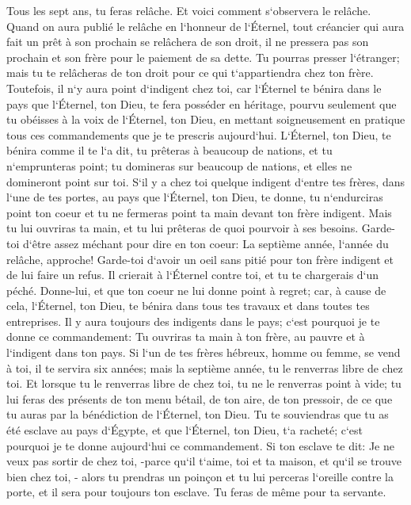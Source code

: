\verse Tous les sept ans, tu feras relâche. 
\verse Et voici comment s`observera le relâche. Quand on aura publié le relâche en l`honneur de l`Éternel, tout créancier qui aura fait un prêt à son prochain se relâchera de son droit, il ne pressera pas son prochain et son frère pour le paiement de sa dette. 
\verse Tu pourras presser l`étranger; mais tu te relâcheras de ton droit pour ce qui t`appartiendra chez ton frère. 
\verse Toutefois, il n`y aura point d`indigent chez toi, car l`Éternel te bénira dans le pays que l`Éternel, ton Dieu, te fera posséder en héritage, 
\verse pourvu seulement que tu obéisses à la voix de l`Éternel, ton Dieu, en mettant soigneusement en pratique tous ces commandements que je te prescris aujourd`hui. 
\verse L`Éternel, ton Dieu, te bénira comme il te l`a dit, tu prêteras à beaucoup de nations, et tu n`emprunteras point; tu domineras sur beaucoup de nations, et elles ne domineront point sur toi. 
\verse S`il y a chez toi quelque indigent d`entre tes frères, dans l`une de tes portes, au pays que l`Éternel, ton Dieu, te donne, tu n`endurciras point ton coeur et tu ne fermeras point ta main devant ton frère indigent. 
\verse Mais tu lui ouvriras ta main, et tu lui prêteras de quoi pourvoir à ses besoins. 
\verse Garde-toi d`être assez méchant pour dire en ton coeur: La septième année, l`année du relâche, approche! Garde-toi d`avoir un oeil sans pitié pour ton frère indigent et de lui faire un refus. Il crierait à l`Éternel contre toi, et tu te chargerais d`un péché. 
\verse Donne-lui, et que ton coeur ne lui donne point à regret; car, à cause de cela, l`Éternel, ton Dieu, te bénira dans tous tes travaux et dans toutes tes entreprises. 
\verse Il y aura toujours des indigents dans le pays; c`est pourquoi je te donne ce commandement: Tu ouvriras ta main à ton frère, au pauvre et à l`indigent dans ton pays. 
\verse Si l`un de tes frères hébreux, homme ou femme, se vend à toi, il te servira six années; mais la septième année, tu le renverras libre de chez toi. 
\verse Et lorsque tu le renverras libre de chez toi, tu ne le renverras point à vide; 
\verse tu lui feras des présents de ton menu bétail, de ton aire, de ton pressoir, de ce que tu auras par la bénédiction de l`Éternel, ton Dieu. 
\verse Tu te souviendras que tu as été esclave au pays d`Égypte, et que l`Éternel, ton Dieu, t`a racheté; c`est pourquoi je te donne aujourd`hui ce commandement. 
\verse Si ton esclave te dit: Je ne veux pas sortir de chez toi, -parce qu`il t`aime, toi et ta maison, et qu`il se trouve bien chez toi, - 
\verse alors tu prendras un poinçon et tu lui perceras l`oreille contre la porte, et il sera pour toujours ton esclave. Tu feras de même pour ta servante. 
